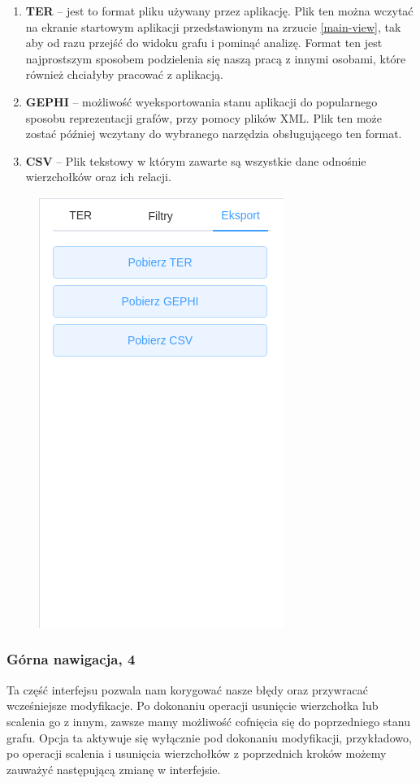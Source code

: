 \documentclass[12pt, a4paper]{article}
\begin{document}
\begin{enumerate}
    \item \textbf{TER} -- jest to format pliku używany przez aplikację. Plik ten można wczytać na ekranie startowym aplikacji przedstawionym na zrzucie \ref{main-view}, tak aby od razu przejść do widoku grafu i pominąć analizę. Format ten jest najprostszym sposobem podzielenia się naszą pracą z innymi osobami, które również chciałyby pracować z aplikacją.
    \item \textbf{GEPHI} -- możliwość wyeksportowania stanu aplikacji do popularnego sposobu reprezentacji grafów, przy pomocy plików XML. Plik ten może zostać później wczytany do wybranego narzędzia obsługującego ten format.
    \item \textbf{CSV} -- Plik tekstowy w którym zawarte są wszystkie dane odnośnie wierzchołków oraz ich relacji.
\end{enumerate}

\begin{figure}[H]
    \centering
    \includegraphics[width=0.4\linewidth]{images/graph-export.png}
\end{figure}

\subsubsection{Górna nawigacja, 4}

Ta część interfejsu pozwala nam korygować nasze błędy oraz przywracać wcześniejsze modyfikacje. Po dokonaniu operacji usunięcie wierzchołka lub scalenia go z innym, zawsze mamy możliwość cofnięcia się do poprzedniego stanu grafu. Opcja ta aktywuje się wyłącznie pod dokonaniu modyfikacji, przykładowo, po operacji scalenia i usunięcia wierzchołków z poprzednich kroków możemy zauważyć następującą zmianę w interfejsie.
\end{document}
